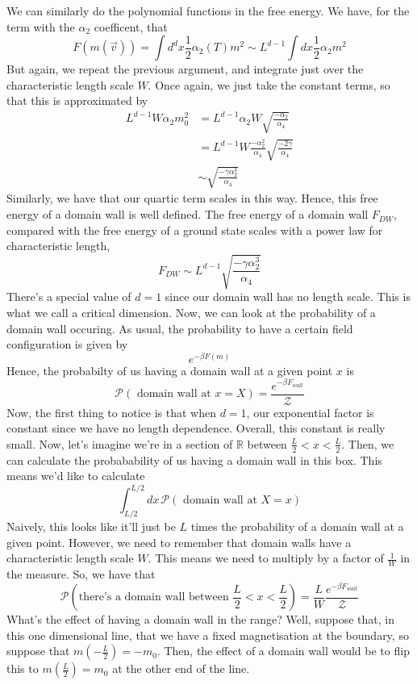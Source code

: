 \documentclass[11pt, oneside]{article}   	%
\newcommand{ \R}{ \mathbb{ R} }
\begin{document}
We can similarly do the polynomial functions in the free energy. 
We have, for the term with the $\alpha_2 $ coefficent, that 
\[
	F ( m ( \vec{v}) )  = \int d^{d }x \frac{1}{2 } \alpha_2( T ) m^ 2 \sim L^{d - 1} \int dx \frac{1}{2} \alpha_2 m^ 2
\] But again, we repeat the previous argument, 
and integrate just over the characteristic length scale $W$. 
Once again, we just take the constant terms, so that this 
is approximated by 
\begin{align*}
	L^{d - 1} W \alpha_2 m_{0}^2 &= L^{d - 1}\alpha_2W \sqrt{\frac{-\alpha_2}{\alpha_4}}  \\
	&= L^{d -1} W \frac{ - \alpha_2^2 }{\alpha_4 } \sqrt{\frac{ - 2 \gamma }{\alpha_4}}  \\
	& \sim \sqrt{ \frac{ - \gamma \alpha_2^3 }{\alpha_4 }} 
\end{align*}
Similarly, we have that our quartic term scales in this way. 
Hence, this free energy of a domain wall is well defined. 
The free energy of a domain wall $F_{DW}$, compared with the free energy of a ground state scales with a power law for characteristic length, 
\[ 
F_{ DW} \sim L^{ d - 1} \sqrt{ \frac{  - \gamma \alpha_2^3 }{ \alpha_4} } 
\] 
There's a special value of $d = 1$ since our domain wall has no length scale. 
This is what we call a critical dimension. 
Now, we can look at the probability of a domain wall occuring. 
As usual, the probability to have a certain field configuration is 
given by 
\[
	e^{  - \beta F ( m ) }
\] Hence, the probabilty of us having a domain wall at a given point $ x $ is 
\[
	\mathcal{  P}(\text{ domain wall at } x = X )  = \frac{e^{- \beta F_{wall}}}{\mathcal{ Z}}
\] Now, the first thing to notice is that when $ d= 1$, our exponential factor 
is constant since we have no length dependence. 
Overall, this constant is really small. Now, let's imagine 
we're in a section of  $ \R$ between $ \frac{L}{ 2} < x < \frac{L}{2}$. 
Then, we can calculate the probabability of us having a domain wall in this box. 
This means we'd like to calculate 
\[
	\int_{L / 2 }^{ L / 2 } dx \, \mathcal{ P }( \text{ domain wall at } X = x ) 
\] Naively, this looks like it'll just be $ L $ times the probability of a domain wall at a given point. 
However, we need to remember that domain walls have a characteristic length scale  $W$. 
This means we need to multiply by a factor of $ \frac{1}{ W} $ in the measure. 
So, we have that 
\[	\mathcal{ P }( \text{there's a domain wall between } \frac{L}{2 }< x < \frac{L}{2} )  = \frac{L}{W} \frac{e^{ - \beta F_{ wall}}}{ \mathcal{ Z }} 
\] What's the effect of having a domain wall in the range? 
Well, suppose that, in this one dimensional line, that we have a 
fixed magnetisation at the boundary, so suppose that $ m (  - \frac{L}{2 }) =  - m_{0 } $.
Then, the effect of a domain wall would be to flip this to $ m ( \frac{L}{2 })  = m_{ 0 } $ 
at the other end of the line. 
\end{document}
